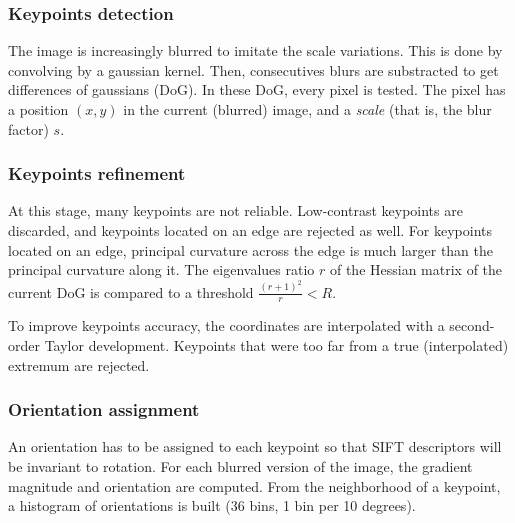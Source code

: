 \documentclass[preprint]{iucr}
\begin{document}
\subsubsection{Keypoints detection}
The image is increasingly blurred to imitate the scale variations. 
This is done by convolving by a gaussian kernel. 
Then, consecutives blurs are substracted to get differences of gaussians (DoG). 
In these DoG, every pixel is tested. 
The pixel has a position $(x,y)$ in the current (blurred) image, and a
\textit{scale} (that is, the blur factor) $s$. 



\subsubsection{Keypoints refinement}

At this stage, many keypoints are not reliable. 
Low-contrast keypoints are discarded, and keypoints located on an edge are
rejected as well.  
For keypoints located on an edge, principal curvature across the edge is much
larger than the principal curvature along it. 
The eigenvalues ratio $r$ of the Hessian matrix of the current DoG is compared
to a threshold $\frac{(r+1)^2}{r} < R$. 

To improve keypoints accuracy, the coordinates are interpolated with a
second-order Taylor development. 
Keypoints that were too far from a true (interpolated) extremum are rejected. 


\subsubsection{Orientation assignment}
An orientation has to be assigned to each keypoint so that SIFT descriptors will
be invariant to rotation. 
For each blurred version of the image, the gradient magnitude and orientation
are computed. 
From the neighborhood of a keypoint, a histogram of orientations is built (36
bins, 1 bin per 10 degrees). 
\end{document}

